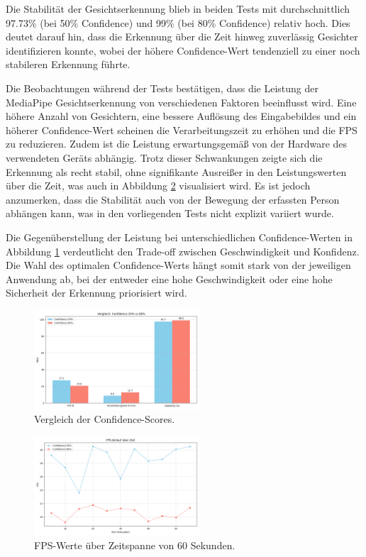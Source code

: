 Die Stabilität der Gesichtserkennung blieb in beiden Tests mit durchschnittlich 97.73\% (bei 50\% Confidence) und 99\% (bei 80\% Confidence) relativ hoch. Dies deutet darauf hin, dass die Erkennung über die Zeit hinweg zuverlässig Gesichter identifizieren konnte, wobei der höhere Confidence-Wert tendenziell zu einer noch stabileren Erkennung führte.

Die Beobachtungen während der Tests bestätigen, dass die Leistung der MediaPipe Gesichtserkennung von verschiedenen Faktoren beeinflusst wird. Eine höhere Anzahl von Gesichtern, eine bessere Auflösung des Eingabebildes und ein höherer Confidence-Wert scheinen die Verarbeitungszeit zu erhöhen und die FPS zu reduzieren. Zudem ist die Leistung erwartungsgemäß von der Hardware des verwendeten Geräts abhängig. Trotz dieser Schwankungen zeigte sich die Erkennung als recht stabil, ohne signifikante Ausreißer in den Leistungswerten über die Zeit, was auch in Abbildung \ref{fig:fps_ueber_zeit} visualisiert wird. Es ist jedoch anzumerken, dass die Stabilität auch von der Bewegung der erfassten Person abhängen kann, was in den vorliegenden Tests nicht explizit variiert wurde.

Die Gegenüberstellung der Leistung bei unterschiedlichen Confidence-Werten in Abbildung \ref{fig:vergleich_confidence} verdeutlicht den Trade-off zwischen Geschwindigkeit und Konfidenz. Die Wahl des optimalen Confidence-Werts hängt somit stark von der jeweiligen Anwendung ab, bei der entweder eine hohe Geschwindigkeit oder eine hohe Sicherheit der Erkennung priorisiert wird.

\begin{figure}[ht]
    \centering
    \includegraphics[width=0.55\textwidth]{data/Vergleich_Confidence_50_vs_80.png}
    \caption{Vergleich der Confidence-Scores.}
    \label{fig:vergleich_confidence}
\end{figure}


\begin{figure}[ht]
    \centering
    \includegraphics[width=0.55\textwidth]{data/FPS_ueber_Zeit.png}
    \caption{FPS-Werte über Zeitspanne von 60 Sekunden.}
    \label{fig:fps_ueber_zeit}
\end{figure}

